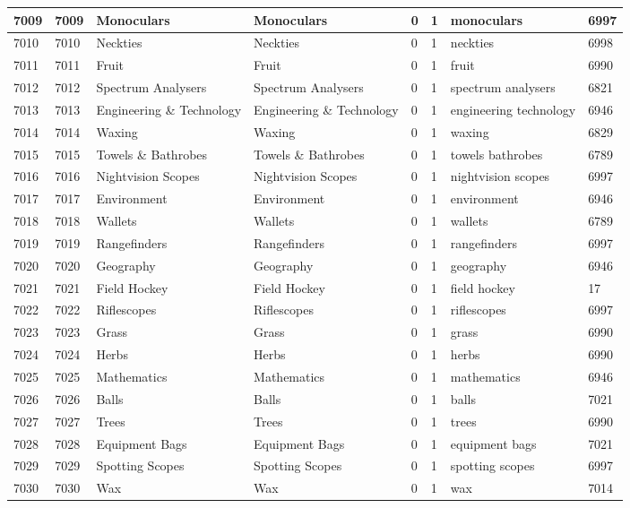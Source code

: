 \begin{longtable}{|l|l|l|l|l|l|l|l|}
7009 & 7009 & Monoculars & Monoculars & 0 & 1 & monoculars & 6997 \\ \hline 
7010 & 7010 & Neckties & Neckties & 0 & 1 & neckties & 6998 \\ \hline 
7011 & 7011 & Fruit & Fruit & 0 & 1 & fruit & 6990 \\ \hline 
7012 & 7012 & Spectrum Analysers & Spectrum Analysers & 0 & 1 & spectrum analysers & 6821 \\ \hline 
7013 & 7013 & Engineering \& Technology & Engineering \& Technology & 0 & 1 & engineering technology & 6946 \\ \hline 
7014 & 7014 & Waxing & Waxing & 0 & 1 & waxing & 6829 \\ \hline 
7015 & 7015 & Towels \& Bathrobes & Towels \& Bathrobes & 0 & 1 & towels bathrobes & 6789 \\ \hline 
7016 & 7016 & Nightvision Scopes & Nightvision Scopes & 0 & 1 & nightvision scopes & 6997 \\ \hline 
7017 & 7017 & Environment & Environment & 0 & 1 & environment & 6946 \\ \hline 
7018 & 7018 & Wallets & Wallets & 0 & 1 & wallets & 6789 \\ \hline 
7019 & 7019 & Rangefinders & Rangefinders & 0 & 1 & rangefinders & 6997 \\ \hline 
7020 & 7020 & Geography & Geography & 0 & 1 & geography & 6946 \\ \hline 
7021 & 7021 & Field Hockey & Field Hockey & 0 & 1 & field hockey & 17 \\ \hline 
7022 & 7022 & Riflescopes & Riflescopes & 0 & 1 & riflescopes & 6997 \\ \hline 
7023 & 7023 & Grass & Grass & 0 & 1 & grass & 6990 \\ \hline 
7024 & 7024 & Herbs & Herbs & 0 & 1 & herbs & 6990 \\ \hline 
7025 & 7025 & Mathematics & Mathematics & 0 & 1 & mathematics & 6946 \\ \hline 
7026 & 7026 & Balls & Balls & 0 & 1 & balls & 7021 \\ \hline 
7027 & 7027 & Trees & Trees & 0 & 1 & trees & 6990 \\ \hline 
7028 & 7028 & Equipment Bags & Equipment Bags & 0 & 1 & equipment bags & 7021 \\ \hline 
7029 & 7029 & Spotting Scopes & Spotting Scopes & 0 & 1 & spotting scopes & 6997 \\ \hline 
7030 & 7030 & Wax & Wax & 0 & 1 & wax & 7014 \\ \hline 

\end{longtable}
